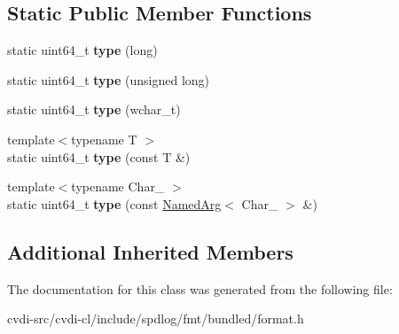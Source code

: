 \subsection*{Static Public Member Functions}
\begin{DoxyCompactItemize}
\item 
static uint64\+\_\+t {\bfseries type} (long)\hypertarget{classfmt_1_1internal_1_1MakeValue_a595ab8ee3b95d916881ffe40db3a13b0}{}\label{classfmt_1_1internal_1_1MakeValue_a595ab8ee3b95d916881ffe40db3a13b0}

\item 
static uint64\+\_\+t {\bfseries type} (unsigned long)\hypertarget{classfmt_1_1internal_1_1MakeValue_a797f6663d8fdaf02cf254c05dbb19647}{}\label{classfmt_1_1internal_1_1MakeValue_a797f6663d8fdaf02cf254c05dbb19647}

\item 
static uint64\+\_\+t {\bfseries type} (wchar\+\_\+t)\hypertarget{classfmt_1_1internal_1_1MakeValue_adf70f5e369c149ce2916b73bea8c2af9}{}\label{classfmt_1_1internal_1_1MakeValue_adf70f5e369c149ce2916b73bea8c2af9}

\item 
{\footnotesize template$<$typename T $>$ }\\static uint64\+\_\+t {\bfseries type} (const T \&)\hypertarget{classfmt_1_1internal_1_1MakeValue_ada410611bcfef70448489daaf4b0e66a}{}\label{classfmt_1_1internal_1_1MakeValue_ada410611bcfef70448489daaf4b0e66a}

\item 
{\footnotesize template$<$typename Char\+\_\+ $>$ }\\static uint64\+\_\+t {\bfseries type} (const \hyperlink{structfmt_1_1internal_1_1NamedArg}{Named\+Arg}$<$ Char\+\_\+ $>$ \&)\hypertarget{classfmt_1_1internal_1_1MakeValue_a346c9fe85895cf679c651ec45e726a64}{}\label{classfmt_1_1internal_1_1MakeValue_a346c9fe85895cf679c651ec45e726a64}

\end{DoxyCompactItemize}
\subsection*{Additional Inherited Members}


The documentation for this class was generated from the following file\+:\begin{DoxyCompactItemize}
\item 
cvdi-\/src/cvdi-\/cl/include/spdlog/fmt/bundled/format.\+h\end{DoxyCompactItemize}
